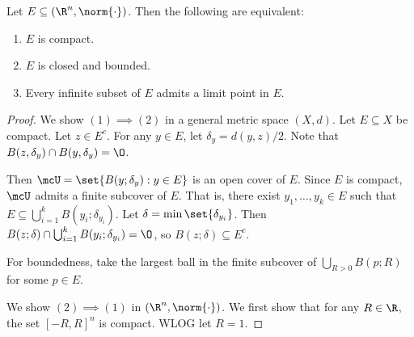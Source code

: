\begin{theorem}
    Let $E \subseteq (\R^n, \norm{\cdot})$.
    Then the following are equivalent:
    \begin{enumerate}[label=(\arabic*)]
        \item $E$ is compact.
        \item $E$ is closed and bounded.
        \item Every infinite subset of $E$ admits a limit point in $E$.
    \end{enumerate}
\end{theorem}
\begin{proof}
    We show $(1) \implies (2)$ in a general metric space $(X, d)$.
    Let $E \subseteq X$ be compact.
    Let $z \in E^c$.
    For any $y \in E$, let $\delta_y = d(y, z) / 2$.
    Note that $B(z, \delta_y) \cap B(y, \delta_y) = \O$.

    Then $\mcU = \set{B(y; \delta_y) : y \in E}$ is an open cover of $E$.
    Since $E$ is compact, $\mcU$ admits a finite subcover of $E$.
    That is, there exist $y_1, \dots, y_k \in E$ such that
    $E \subseteq \bigcup_{i = 1}^k B(y_i; \delta_{y_i})$.
    Let $\delta = \min\set{\delta_{y_i}}$.
    Then $B(z; \delta) \cap \bigcup_{i = 1}^k B(y_i; \delta_{y_i}) = \O$,
    so $B(z; \delta) \subseteq E^c$.

    For boundedness, take the largest ball in the finite subcover of
    $\bigcup_{R > 0} B(p; R)$ for some $p \in E$.

    We show $(2) \implies (1)$ in $(\R^n, \norm{\cdot})$.
    We first show that for any $R \in \R$, the set $[-R, R]^n$ is compact.
    WLOG let $R = 1$.
\end{proof}
